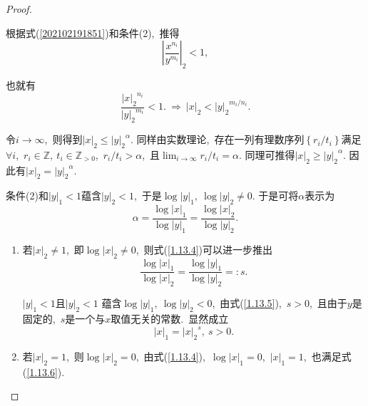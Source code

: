 \documentclass[UTF8, twoside]{ctexart}
\theoremstyle{nonumberplain}
\newtheorem{proof}{\heiti 证明}  %
\theoremstyle{nonumberplain}
\theoremstyle{plain}
\begin{document}
\begin{proof}
\begin{enumerate}
\begin{enumerate}
\begin{enumerate}
				根据式(\ref{202102191851})和条件(2),\ 推得
				\[
					{{\left| \frac{{{x}^{{{n}_{i}}}}}{{{y}^{{{m}_{i}}}}} \right|}_{2}}<1,
				\]
				
				也就有
				\[
					\frac{{{\left| x \right|}_{2}}^{{{n}_{i}}}}{{{\left| y \right|}_{2}}^{{{m}_{i}}}}<1
					.\ \Longrightarrow \ 
					{{\left| x \right|}_{2}}<{{\left| y \right|}_{2}}^{{{{m}_{i}}}/{{{n}_{i}}}}.
				\]
				
				令$i\rightarrow \infty $,\ 则得到${{\left| x \right|}_{2}}\le {{\left| y \right|}_{2}}^{\alpha }$. 
				同样由实数理论,\ 存在一列有理数序列$\left\{ {{{r}_{i}}}/{{{t}_{i}}} \right\}$满足$\forall i$,\ ${{r}_{i}} \in \mathbb{Z},\ {{t}_{i}} \in \mathbb{Z}_{>0}$,\ ${{{r}_{i}}}/{{{t}_{i}}}>\alpha $,\ 
				且$\lim_{i\rightarrow \infty }{{{r}_{i}}}/{{{t}_{i}}}=\alpha $. 同理可推得${{\left| x \right|}_{2}}\ge {{\left| y \right|}_{2}}^{\alpha }$. 因此有${{\left| x \right|}_{2}}={{\left| y \right|}_{2}}^{\alpha }$. 
				
				条件(2)和${{\left| y \right|}_{1}}<1$蕴含${{\left| y \right|}_{2}}<1$,\ 于是$\log {{\left| y \right|}_{1}},\ \log {{\left| y \right|}_{2}}\ne 0$. 于是可将$\alpha $表示为
				\begin{equation} \label{1.13.4}
					\alpha =\frac{\log {{\left| x \right|}_{1}}}{\log {{\left| y \right|}_{1}}}=\frac{\log {{\left| x \right|}_{2}}}{\log {{\left| y \right|}_{2}}}.
				\end{equation}
				\vskip 0.3cm
				\begin{enumerate}
					\item 若${{\left| x \right|}_{2}}\ne 1$,\ 即$\log {{\left| x \right|}_{2}}\ne 0$,\ 
					则式(\ref{1.13.4})可以进一步推出
					\begin{equation} \label{1.13.5}
						\frac{\log {{\left| x \right|}_{1}}}{\log {{\left| x \right|}_{2}}}=\frac{\log {{\left| y \right|}_{1}}}{\log {{\left| y \right|}_{2}}}=:s.
					\end{equation}
				
					${{\left| y \right|}_{1}}<1$且${{\left| y \right|}_{2}}<1$
					蕴含$\log {{\left| y \right|}_{1}},\ \log {{\left| y \right|}_{2}}<0$,\ 
					由式(\ref{1.13.5}),\ $s>0$,\ 且由于$y$是固定的,\ $s$是一个与$x$取值无关的常数.\ 显然成立
					\begin{equation}  \label{1.13.6}
						{{\left| x \right|}_{1}}={{\left| x \right|}_{2}}^{s},\ s>0.
					\end{equation}
					\vskip 0.3cm
					\item 若${{\left| x \right|}_{2}}=1$,\ 则$\log {{\left| x \right|}_{2}}=0$,\ 
					由式(\ref{1.13.4}),\ $\log {{\left| x \right|}_{1}}=0$,\ ${{\left| x \right|}_{1}}=1$,\ 
					也满足式(\ref{1.13.6}).\ 
				\end{enumerate}
				\vskip 0.3cm
				

\end{enumerate}
\end{enumerate}
\end{enumerate}
\end{proof}
\end{document}
